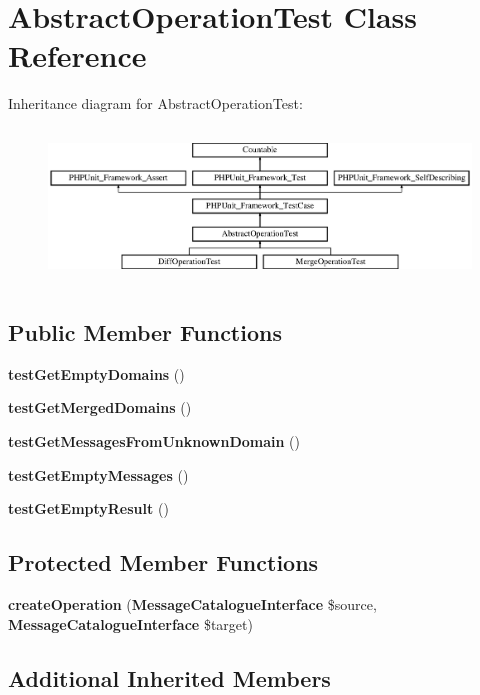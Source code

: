\section{Abstract\+Operation\+Test Class Reference}
\label{class_symfony_1_1_component_1_1_translation_1_1_tests_1_1_catalogue_1_1_abstract_operation_test}
Inheritance diagram for Abstract\+Operation\+Test\+:\begin{figure}[H]
\begin{center}
\leavevmode
\includegraphics[height=4.129793cm]{class_symfony_1_1_component_1_1_translation_1_1_tests_1_1_catalogue_1_1_abstract_operation_test}
\end{center}
\end{figure}
\subsection*{Public Member Functions}
\begin{DoxyCompactItemize}
\item 
{\bf test\+Get\+Empty\+Domains} ()
\item 
{\bf test\+Get\+Merged\+Domains} ()
\item 
{\bf test\+Get\+Messages\+From\+Unknown\+Domain} ()
\item 
{\bf test\+Get\+Empty\+Messages} ()
\item 
{\bf test\+Get\+Empty\+Result} ()
\end{DoxyCompactItemize}
\subsection*{Protected Member Functions}
\begin{DoxyCompactItemize}
\item 
{\bf create\+Operation} ({\bf Message\+Catalogue\+Interface} \$source, {\bf Message\+Catalogue\+Interface} \$target)
\end{DoxyCompactItemize}
\subsection*{Additional Inherited Members}


